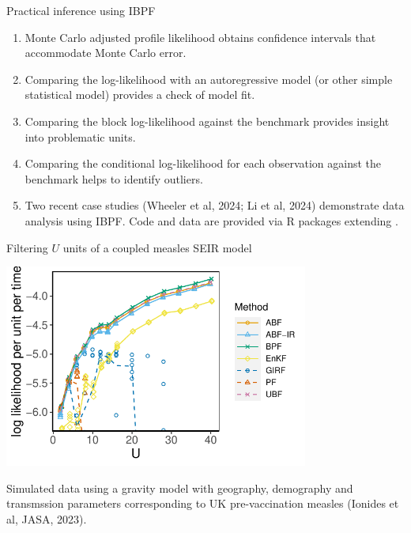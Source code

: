 \documentclass{beamer}
\begin{document}
\begin{frame}{Practical inference using IBPF}
  \begin{enumerate}
  \item Monte Carlo adjusted profile likelihood \citep{ionides17profile} obtains confidence intervals that accommodate Monte Carlo error.

  \item Comparing the log-likelihood with an autoregressive model (or other simple statistical model) provides a check of model fit.

  \item Comparing the block log-likelihood against the benchmark provides insight into problematic units.

    \item Comparing the conditional log-likelihood for each observation against the benchmark helps to identify outliers. 

    \item Two recent case studies (Wheeler et al, 2024; Li et al, 2024) demonstrate data analysis using IBPF. Code and data are provided via R packages extending .
      
  \end{enumerate}
  
  \end{frame}

\begin{frame}{Filtering $U$ units of a coupled measles SEIR model}

\vspace{-1mm}

\begin{center}
\includegraphics[width=10cm]{mscale_loglik_plot-1.pdf}


\end{center}

\vspace{-4mm}

Simulated data using a gravity model with geography, demography and transmssion parameters corresponding to UK pre-vaccination measles (Ionides et al, {JASA}, 2023).


\end{frame}
\end{document}
